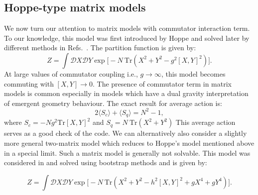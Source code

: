 \documentclass[11pt]{article}
\begin{document}
\subsection{\label{subsec:Hoppe}Hoppe-type matrix models}
We now turn our attention to matrix models with commutator interaction term. 
To our knowledge, this model 
was first introduced by Hoppe \cite{Hoppe:1982en} and solved later by different methods in 
Refs.~\cite{Kazakov:1998ji,Berenstein:2008eg}.
The partition function is given by:
\begin{equation}
Z = \int \mathcal{D}X \mathcal{D}Y \exp \Big[-N ~ \mbox{Tr} (X^2 + Y^2 - g^2 [X,Y]^2) \Big]. 
\end{equation}
At large values of commutator coupling i.e., $ g \to \infty$, this model becomes commuting with 
$ [X,Y] \to 0$. The presence of commutator term in matrix models is common especially in 
models which have a dual gravity interpretation of emergent geometry behaviour. 
The exact result for average action is:
\begin{equation}
	2 \langle S_{c} \rangle + \langle S_{q}  \rangle = N^2 - 1, 
\end{equation}
where $ S_{c} = -Ng^2 \mbox{Tr}[X,Y]^2$  and 
$ S_{q} = N~\mbox{Tr} (X^2 + Y^2) $
This average action serves as a good check of the code. We can alternatively also consider a slightly more 
general two-matrix model which reduces to Hoppe's model mentioned above in a special limit. 
Such a matrix model is generally not solvable. This model was considered in \cite{Kazakov:2021lel} and 
solved using bootstrap methods and is given by:

\begin{equation}
\label{eq:GHM1} 
Z = \int \mathcal{D}X \mathcal{D}Y \exp \Big[-N ~ \mbox{Tr} (X^2 + Y^2 - h^2 [X,Y]^2 + gX^4 + gY^4) \Big].	
\end{equation}
\end{document}
